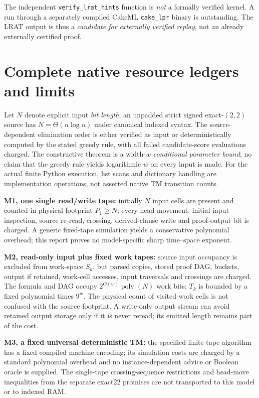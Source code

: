 \documentclass[11pt]{article}
\begin{document}
The independent \texttt{verify\_lrat\_hints} function is \emph{not} a formally verified kernel. A run through a separately compiled CakeML \texttt{cake\_lpr} binary is outstanding. The LRAT output is thus a \emph{candidate for externally verified replay}, not an already externally certified proof.

\section{Complete native resource ledgers and limits}
Let $N$ denote explicit input \emph{bit length}; an unpadded strict signed exact-$(2,2)$ source has $N=\Theta(n\log n)$ under canonical indexed syntax. The source-dependent elimination order is either verified as input or deterministically computed by the stated greedy rule, with all failed candidate-score evaluations charged. The constructive theorem is a width-$w$ \emph{conditional parameter bound}; no claim that the greedy rule yields logarithmic $w$ on every input is made. For the actual finite Python execution, list scans and dictionary handling are implementation operations, not asserted native TM transition counts.

\noindent\textbf{M1, one single read/write tape:} initially $N$ input cells are present and counted in physical footprint $P_1\ge N$; every head movement, initial input inspection, source re-read, crossing, derived-clause write and proof-output bit is charged. A generic fixed-tape simulation yields a conservative polynomial overhead; this report proves no model-specific sharp time--space exponent.

\noindent\textbf{M2, read-only input plus fixed work tapes:} source input occupancy is excluded from work-space $S_k$, but parsed copies, stored proof DAG, buckets, output if retained, work-cell accesses, input traversals and crossings are charged. The formula and DAG occupy $2^{O(w)}\operatorname{poly}(N)$ work bits; $T_k$ is bounded by a fixed polynomial times $9^w$. The physical count of visited work cells is not confused with the source footprint. A write-only output stream can avoid retained output storage only if it is never reread; its emitted length remains part of the cost.

\noindent\textbf{M3, a fixed universal deterministic TM:} the specified finite-tape algorithm has a fixed compiled machine encoding; its simulation costs are charged by a standard polynomial overhead and no instance-dependent advice or Boolean oracle is supplied. The single-tape crossing-sequence restrictions and head-move inequalities from the separate exact22 promises are not transported to this model or to indexed RAM.
\end{document}
